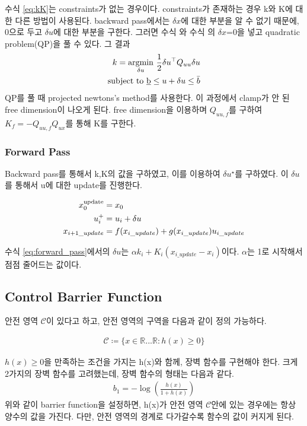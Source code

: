 \documentclass[journal]{IEEEtran}
\begin{document}
	수식 \ref{eq:kK}는 constraints가 없는 경우이다. constraints가 존재하는 경우 k와 K에 대한 다른 방법이 사용된다. backward pass에서는 $\delta x$에 대한 부분을 알 수 없기 때문에, 0으로 두고 $ \delta u$에 대한 부분을 구한다. 그러면 수식 와 수식 의 $\delta x$=0을 넣고 quadratic problem(QP)을 풀 수 있다.
	그 결과
	\begin{align*}
		k=\underset{\delta u}{\rm argmin} ~{1 \over 2}\delta u^{\top}Q_{uu}\delta u\\
		{\rm subject \  to}\  \underbar{b} \leq u+\delta u \leq \bar{b}
	\end{align*}
	QP를 풀 때 projected newtons's method를 사용한다. 이 과정에서 clamp가 안 된 free dimension이 나오게 된다. free dimension을 이용하며 $Q_{uu,f}$를 구하여 $K_f=-Q_{uu,f}Q_{ux}$를 통해 K를 구한다.
	
	\subsubsection{Forward Pass}
	Backward pass를 통해서 k,K의 값을 구하였고, 이를 이용하여 $\delta u^{\star}$를 구하였다.
	이 $\delta u$를 통해서 u에 대한 update를 진행한다.
	
	\begin{align}
		x_{0}^{\rm update}&=x_0\nonumber\\
		u_{i}^+&=u_i+\delta u\nonumber\\
		x_{i+1\_update}&=f(x_{i\_update})+g(x_{i\_update})u_{i\_update}
		\label{eq:forward_pass}	
	\end{align}
	
	수식 \eqref{eq:forward_pass}에서의 $\delta u$는 $\alpha k_i+K_i(x_{i\_update}-x_i)$이다. $\alpha$는 1로 시작해서 점점 줄어드는 값이다.
	
	\subsection{Control Barrier Function}
	안전 영역 $\mathcal{C}$이 있다고 하고, 안전 영역의 구역을 다음과 같이 정의 가능하다.
	
	\begin{align}
		\mathcal{C} \coloneqq \{x \in \mathbb{R}... \mathds{R} : h(x) \geq 0 \}
		\label{eq:safe_region}
	\end{align}
	
	$h(x) \geq 0$을 만족하는 조건을 가지는 h(x)와 함께, 장벽 함수를 구현해야 한다.
	크게 2가지의 장벽 함수를 고려했는데, 장벽 함수의 형태는 다음과 같다.
	\begin{align}
		b_1=-\log \left(\frac{h(x)}{1+h(x)}  \right) 
		\label{eq:barrier_function}
	\end{align}
	위와 같이 barrier function을 설정하면, h(x)가 안전 영역 $\mathcal{C}$안에 있는 경우에는 항상 양수의 값을 가진다. 다만, 안전 영역의 경계로 다가갈수록 함수의 값이 커지게 된다.\\
\end{document}
